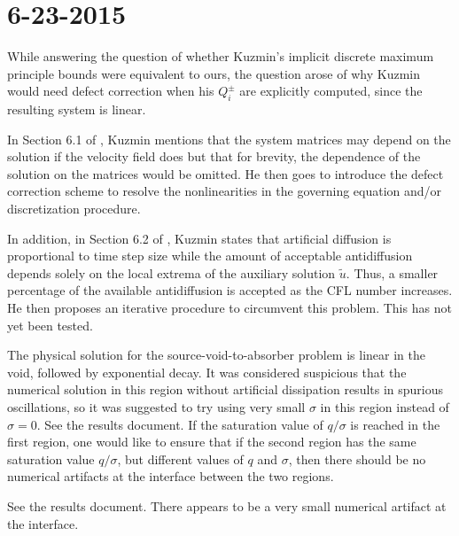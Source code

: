 \section*{6-23-2015}

\begin{enumerate}
While answering the question of whether Kuzmin's implicit discrete maximum
principle bounds were equivalent to ours, the question arose of why Kuzmin
would need defect correction when his $Q_i^\pm$ are explicitly computed,
since the resulting system is linear.

In Section 6.1 of \cite{kuzmin_FCT}, Kuzmin mentions that the system
matrices may depend on the solution if the velocity field does
but that for brevity, the dependence of the solution on the
matrices would be omitted. He then goes to introduce the defect correction
scheme to resolve the nonlinearities in the governing equation and/or
discretization procedure.

In addition, in Section 6.2 of \cite{kuzmin_FCT}, Kuzmin states
that artificial diffusion is proportional to time step size while
the amount of acceptable antidiffusion depends solely on the
local extrema of the auxiliary solution $\tilde{u}$. Thus, a
smaller percentage of the available antidiffusion is accepted
as the CFL number increases. He then proposes an iterative
procedure to circumvent this problem. This has not yet been tested.

The physical solution for the source-void-to-absorber problem is linear
in the void, followed by exponential decay. It was considered
suspicious that the numerical solution in this region without 
artificial dissipation results in spurious oscillations, so
it was suggested to try using very small $\sigma$ in this
region instead of $\sigma=0$.
See the results document.
If the saturation value of $q/\sigma$ is reached in the first
region, one would like to ensure that if the second region has
the same saturation value $q/\sigma$, but different values of
$q$ and $\sigma$, then there should be no numerical artifacts at
the interface between the two regions.

See the results document. There appears to be a very small numerical
artifact at the interface.
\end{enumerate}
